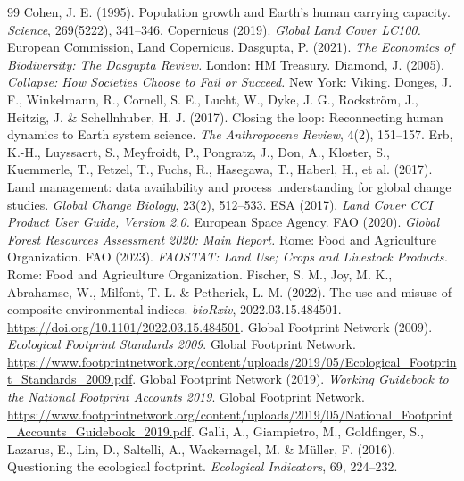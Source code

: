 \begin{thebibliography}{99}
 Cohen, J. E. (1995). Population growth and Earth's human carrying capacity. \emph{Science}, 269(5222), 341--346.
 Copernicus (2019). \emph{Global Land Cover LC100.} European Commission, Land Copernicus.
 Dasgupta, P. (2021). \emph{The Economics of Biodiversity: The Dasgupta Review.} London: HM Treasury.
 Diamond, J. (2005). \emph{Collapse: How Societies Choose to Fail or Succeed.} New York: Viking.
 Donges, J. F., Winkelmann, R., Cornell, S. E., Lucht, W., Dyke, J. G., Rockstr\"om, J., Heitzig, J. \& Schellnhuber, H. J. (2017). Closing the loop: Reconnecting human dynamics to Earth system science. \emph{The Anthropocene Review}, 4(2), 151--157.
 Erb, K.-H., Luyssaert, S., Meyfroidt, P., Pongratz, J., Don, A., Kloster, S., Kuemmerle, T., Fetzel, T., Fuchs, R., Hasegawa, T., Haberl, H., et al. (2017). Land management: data availability and process understanding for global change studies. \emph{Global Change Biology}, 23(2), 512--533.
 ESA (2017). \emph{Land Cover CCI Product User Guide, Version 2.0.} European Space Agency.
 FAO (2020). \emph{Global Forest Resources Assessment 2020: Main Report.} Rome: Food and Agriculture Organization.
 FAO (2023). \emph{FAOSTAT: Land Use; Crops and Livestock Products.} Rome: Food and Agriculture Organization.
 Fischer, S. M., Joy, M. K., Abrahamse, W., Milfont, T. L. \& Petherick, L. M. (2022). The use and misuse of composite environmental indices. \emph{bioRxiv}, 2022.03.15.484501. \url{https://doi.org/10.1101/2022.03.15.484501}.
 Global Footprint Network (2009). \emph{Ecological Footprint Standards 2009}. Global Footprint Network. \url{https://www.footprintnetwork.org/content/uploads/2019/05/Ecological_Footprint_Standards_2009.pdf}.
 Global Footprint Network (2019). \emph{Working Guidebook to the National Footprint Accounts 2019}. Global Footprint Network. \url{https://www.footprintnetwork.org/content/uploads/2019/05/National_Footprint_Accounts_Guidebook_2019.pdf}.
 Galli, A., Giampietro, M., Goldfinger, S., Lazarus, E., Lin, D., Saltelli, A., Wackernagel, M. \& M\"uller, F. (2016). Questioning the ecological footprint. \emph{Ecological Indicators}, 69, 224--232.

\end{thebibliography}

